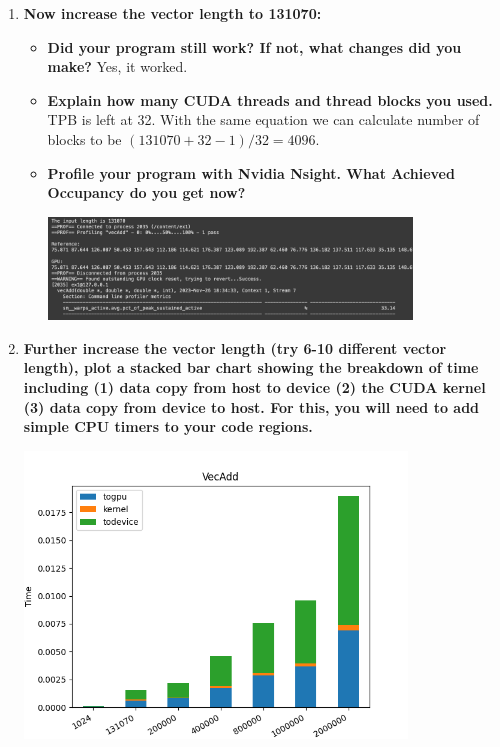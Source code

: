 \documentclass[a4paper,11pt]{scrartcl}
\begin{document}
\begin{enumerate}
\item \textbf{Now increase the vector length to 131070:}
\begin{itemize}
    \item \textbf{Did your program still work? If not, what changes did you make?}
    Yes, it worked.

    \item \textbf{Explain how many CUDA threads and thread blocks you used.}
    TPB is left at 32. With the same equation we can calculate number of blocks to be $(131070 + 32 - 1) / 32 = 4096$.

    \item \textbf{Profile your program with Nvidia Nsight. What Achieved Occupancy do you get now?}

    \includegraphics*[width=0.8\textwidth]{images/ach_occ2.png}
\end{itemize}

\item \textbf{Further increase the vector length (try 6-10 different vector length), plot a stacked bar chart showing the breakdown of time including (1) data copy from host to device (2) the CUDA kernel (3) data copy from device to host. For this, you will need to add simple CPU timers to your code regions.}

\includegraphics*[width=0.8\textwidth]{images/ex1_times.png}

\end{enumerate}
\end{document}
